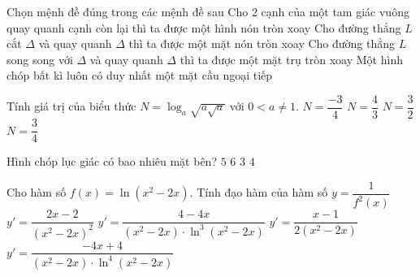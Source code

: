\begin{ex}%
	Chọn mệnh đề đúng trong các mệnh đề sau
	\choice
	{Cho 2 cạnh của một tam giác vuông quay quanh cạnh còn lại thì ta được một hình nón tròn xoay}
	{Cho đường thẳng $L$ cắt $\Delta $ và quay quanh $\Delta $ thì ta được một mặt nón tròn xoay}
	{\True Cho đường thẳng $L$ song song với $\Delta $ và quay quanh $\Delta $ thì ta được một mặt trụ tròn xoay}
	{Một hình chóp bất kì luôn có duy nhất một mặt cầu ngoại tiếp}
\end{ex}
\begin{ex}%
	Tính giá trị của biểu thức $N=\log_a\sqrt{a\sqrt{a}}$ với $0<a\ne 1$.
	\choice
	{$N=\dfrac{-3}{4}$}
	{$N=\dfrac{4}{3}$}
	{$N=\dfrac{3}{2}$}
	{\True $N=\dfrac{3}{4}$}
\end{ex}
\begin{ex}%
Hình chóp lục giác có bao nhiêu mặt bên?
	\choice
	{$5$}
	{\True $6$}
	{$3$}
	{$4$}
\end{ex}
\begin{ex}%
	Cho hàm số $f(x)=\ln \left(x^2-2x\right)$. Tính đạo hàm của hàm số $y=\dfrac{1}{f^2(x)}$
	\choice
	{$y'=\dfrac{2x-2}{\left(x^2-2x\right)^2}$}
	{\True $y'=\dfrac{ 4-4x}{\left(x^2-2x\right)\cdot \ln^3(x^2-2x)}$}
	{$y'=\dfrac{x-1}{2(x^2-2x)}$}
	{$y'=\dfrac{-4x+4}{(x^2-2x)\cdot \ln^4(x^2-2x)}$}
\end{ex}
